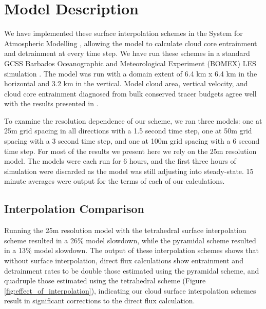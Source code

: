 \documentclass[12pt]{article}
\begin{document}

\section{Model Description}

We have implemented these surface interpolation schemes in the System for 
Atmospheric Modelling \citep[SAM;][]{Khairoutdinov2003}, allowing the model to 
calculate cloud core entrainment and detrainment at every time step.  We have 
run these schemes in a standard GCSS Barbados Oceanographic and Meteorological 
Experiment (BOMEX) LES simulation \citep{Holland1973, Siebesma2003}.  
The model was run with a domain extent of 6.4 km x 6.4 km in the horizontal and 
3.2 km in the vertical.  Model cloud area, vertical velocity, and cloud core 
entrainment diagnosed from bulk conserved tracer budgets agree well with the 
results presented in \cite{Siebesma2003}.

To examine the resolution dependence of our scheme, we ran three models: one at 
25m grid spacing in all directions with a 1.5 second time step, one at 50m grid 
spacing with a 3 second time step, and one at 100m grid spacing with a 6 second 
time step.  For most of the results we present here we rely on the 25m 
resolution model.  The models were each run for 6 hours, and the first 
three hours of simulation were discarded as the model was still adjusting into 
steady-state.  15 minute averages were output for the terms of each of our 
calculations.

\subsection{Interpolation Comparison}


Running the 25m resolution model with the tetrahedral surface interpolation 
scheme resulted in a 26\% model slowdown, while the pyramidal scheme resulted 
in a 13\% model slowdown.  The output of these interpolation schemes shows that 
without surface interpolation, direct flux calculations show entrainment and 
detrainment rates to be double those estimated using the pyramidal scheme, and 
quadruple those estimated using the tetrahedral scheme (Figure 
\ref{fig:effect_of_interpolation}), indicating our cloud surface interpolation 
schemes result in significant corrections to the direct flux calculation.
\end{document}
